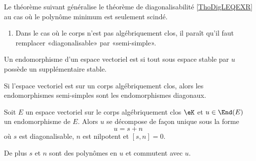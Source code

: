 Le théorème suivant généralise le théorème de diagonalisabilité \ref{ThoDigLEQEXR} au cas où le polynôme minimum est seulement scindé.

\begin{probleme}
    \begin{enumerate}
\item 
    Dans le cas où le corps n'est pas algébriquement clos, il paraît qu'il faut remplacer «diagonalisable» par «semi-simple».
    \end{enumerate}
\end{probleme}

\begin{definition}
    Un endomorphisme d'un espace vectoriel est  si tout sous espace stable par \( u\) possède un supplémentaire stable.
\end{definition}
Si l'espace vectoriel est sur un corps algébriquement clos, alors les endomorphismes semi-simples sont les endomorphismes diagonaux.


\begin{theorem}
    Soit \( E\) un espace vectoriel sur le corps algébriquement clos \( \eK\) et \( u\in\End(E)\) un endomorphisme de \( E\). Alors \( u\) se décompose de façon unique sous la forme
    \begin{equation}
        u=s+n
    \end{equation}
    où \( s\) est diagonalisable, \( n\) est nilpotent et \( [s,n]=0\).

    De plus \( s\) et \( n\) sont des polynômes en \( u\) et commutent avec \( u\).
\end{theorem}

